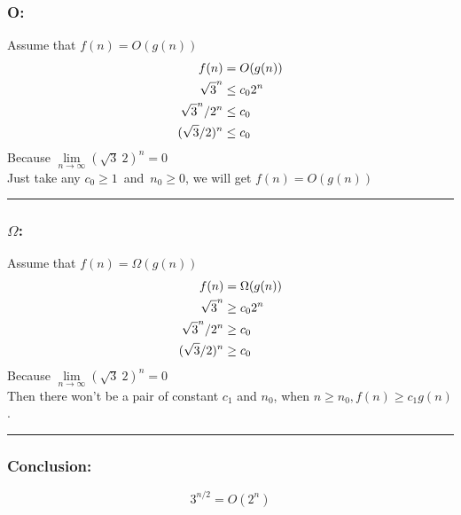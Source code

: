\documentclass[oneside]{homework} %
\begin{document}
\subsubsection* {O:}
Assume that $f(n) = O(g(n))$\\
\begin{equation}
\notag
\begin{aligned}[b]
f(n) &= O(g(n)) \\
\sqrt{3}^n & \leq c_{0}2^n\\
\sqrt{3}^n / 2^n & \leq c_{0} \\
(\sqrt{3} / 2)^n & \leq c_{0} \\
\end{aligned}
\end{equation}
Because $\lim\limits_{n\to\infty}{(\sqrt{3}\ 2)^n}  = 0$
\\ Just take any $ c_{0} \geq 1 $~and~$n_{0}\geq 0$, we will get $f(n) = O(g(n))$ 
\\ \rule{3mm}{3mm}

\subsubsection* {$\Omega$:}
Assume that $f(n) = \Omega (g(n))$\\
\begin{equation}
\notag
\begin{aligned}[b]
f(n) &= \Omega(g(n)) \\
\sqrt{3}^n & \geq c_{0}2^n\\
\sqrt{3}^n / 2^n & \geq c_{0} \\
(\sqrt{3} / 2)^n & \geq c_{0} \\
\end{aligned}
\end{equation}
Because $\lim\limits_{n\to\infty}{(\sqrt{3}\ 2)^n}  = 0$
\\Then there won't be a pair of constant $c_{1}$ and $n_{0}$, when $n \geq n_{0} , f(n) \geq c_{1}g(n) $.
\\ \rule{3mm}{3mm}

\subsubsection* {Conclusion:}
$$3^{n/2} = O(2^n)$$
\end{document}
